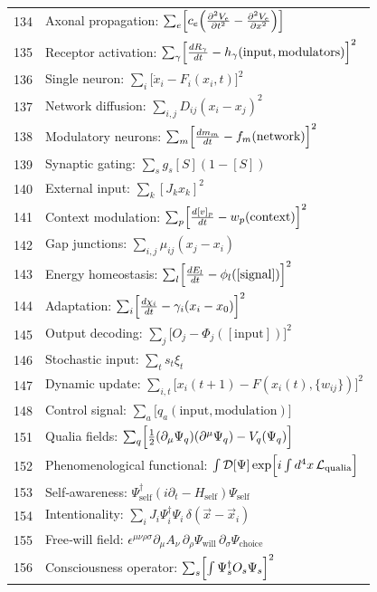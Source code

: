 \documentclass[12pt,a4paper]{article}
\begin{document}
\begin{longtable}{r l}
		134 & Axonal propagation: $\sum_e\Bigl[c_e\Bigl(\frac{\partial^2 V_e}{\partial t^2} - \frac{\partial^2 V_e}{\partial x^2}\Bigr)\Bigr]$ \\
		135 & Receptor activation: $\sum_\gamma\Bigl[\frac{dR_\gamma}{dt} - h_\gamma(\text{input},\text{modulators})\Bigr]^2$ \\
		136 & Single neuron: $\sum_i\bigl[\dot x_i - F_i(x_i,t)\bigr]^2$ \\
		137 & Network diffusion: $\sum_{i,j} D_{ij}(x_i - x_j)^2$ \\
		138 & Modulatory neurons: $\sum_m\Bigl[\frac{dm_m}{dt} - f_m(\text{network})\Bigr]^2$ \\
		139 & Synaptic gating: $\sum_s g_s[S](1-[S])$ \\
		140 & External input: $\sum_k [J_k x_k]^2$ \\
		141 & Context modulation: $\sum_p\Bigl[\frac{d[v]_p}{dt} - w_p(\text{context})\Bigr]^2$ \\
		142 & Gap junctions: $\sum_{i,j}\mu_{ij}(x_j - x_i)$ \\
		143 & Energy homeostasis: $\sum_l\Bigl[\frac{dE_l}{dt} - \phi_l([\text{signal}])\Bigr]^2$ \\
		144 & Adaptation: $\sum_i\Bigl[\frac{d\chi_i}{dt} - \gamma_i(x_i - x_0)\Bigr]^2$ \\
		145 & Output decoding: $\sum_j\bigl[O_j - \Phi_j([\text{input}])\bigr]^2$ \\
		146 & Stochastic input: $\sum_t s_t\xi_t$ \\
		147 & Dynamic update: $\sum_{i,t}\bigl[x_i(t+1) - F(x_i(t),\{w_{ij}\})\bigr]^2$ \\
		148 & Control signal: $\sum_a\bigl[q_a(\text{input},\text{modulation})\bigr]$ \\
		151 & Qualia fields: $\sum_q\Bigl[\frac12(\partial_\mu\Psi_q)(\partial^\mu\Psi_q) - V_q(\Psi_q)\Bigr]$ \\
		152 & Phenomenological functional: $\int\mathcal{D}[\Psi]\exp\Bigl[i\int d^4x\,\mathcal{L}_{\text{qualia}}\Bigr]$ \\
		153 & Self‑awareness: $\Psi^\dagger_{\text{self}}(i\partial_t - H_{\text{self}})\Psi_{\text{self}}$ \\
		154 & Intentionality: $\sum_i J_i\Psi^\dagger_i\Psi_i\,\delta(\vec x - \vec x_i)$ \\
		155 & Free‑will field: $\epsilon^{\mu\nu\rho\sigma}\partial_\mu A_\nu\,\partial_\rho\Psi_{\text{will}}\,\partial_\sigma\Psi_{\text{choice}}$ \\
		156 & Consciousness operator: $\sum_s\Bigl[\int\Psi^\dagger_s O_s\Psi_s\Bigr]^2$ \\

\end{longtable}
\end{document}
